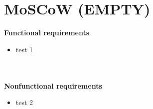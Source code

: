 \section{MoSCoW (EMPTY)}

\textbf{Functional requirements}
\begin{itemize} 
    \item test 1
\end{itemize} \\
\\
\textbf{Nonfunctional requirements}
\begin{itemize} 
    \item test 2
\end{itemize}